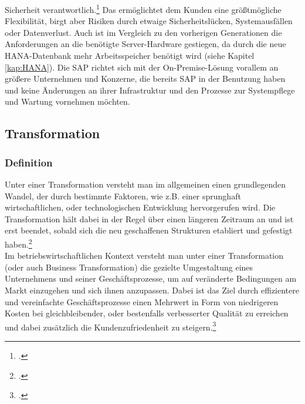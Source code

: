 Sicherheit verantwortlich.\footcite[Vgl.][]{rz10-s4hana} Das ermöglichtet dem Kunden eine größtmögliche Flexibilität, birgt aber Risiken durch etwaige Sicherheitslücken, Systemausfällen oder Datenverlust. Auch ist im Vergleich zu den vorherigen Generationen die Anforderungen an die benötigte Server-Hardware gestiegen, da durch die neue HANA-Datenbank mehr Arbeitsspeicher benötigt wird (siehe Kapitel \ref{kap:HANA}). Die SAP richtet sich mit der On-Premise-Lösung vorallem an größere Unternehmen und Konzerne, die bereits SAP in der Benutzung haben und keine Änderungen an ihrer Infrastruktur und den Prozesse zur Systempflege und Wartung vornehmen möchten.  

\subsection{Transformation}
\subsubsection{Definition}
Unter einer Transformation versteht man im allgemeinen einen grundlegenden Wandel, der durch bestimmte Faktoren, wie z.B. einer sprunghaft wirtschaftlichen, oder technologischen Entwicklung hervorgerufen wird. Die Transformation hält dabei in der Regel über einen längeren Zeitraum an und ist erst beendet, sobald sich die neu geschaffenen Strukturen etabliert und gefestigt haben.\footcite[Vgl.][]{difu}\\ Im betriebswirtschaftlichen Kontext versteht man unter einer Transformation (oder auch Business Transformation) die gezielte Umgestaltung eines Unternehmens und seiner Geschäftsprozesse, um auf veränderte Bedingungen am Markt einzugehen und sich ihnen anzupassen. Dabei ist das Ziel durch effizientere und vereinfachte Geschäftsprozesse einen Mehrwert in Form von niedrigeren Kosten bei gleichbleibender, oder bestenfalls verbesserter Qualität zu erreichen und dabei zusätzlich die Kundenzufriedenheit zu steigern.\footcite[Vgl.][]{leanix}

